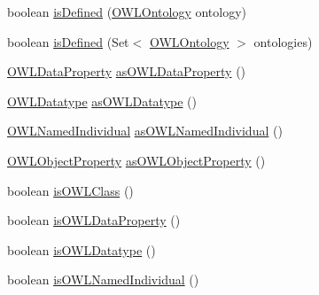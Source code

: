 \begin{DoxyCompactItemize}
\item 
boolean \hyperlink{classuk_1_1ac_1_1manchester_1_1cs_1_1owl_1_1owlapi_1_1_o_w_l_class_impl_a6ab339f48b3019760003eb203528b8b8}{is\-Defined} (\hyperlink{interfaceorg_1_1semanticweb_1_1owlapi_1_1model_1_1_o_w_l_ontology}{O\-W\-L\-Ontology} ontology)
\item 
boolean \hyperlink{classuk_1_1ac_1_1manchester_1_1cs_1_1owl_1_1owlapi_1_1_o_w_l_class_impl_a4c5fc0bef5dc8ad73453abae61482753}{is\-Defined} (Set$<$ \hyperlink{interfaceorg_1_1semanticweb_1_1owlapi_1_1model_1_1_o_w_l_ontology}{O\-W\-L\-Ontology} $>$ ontologies)
\item 
\hyperlink{interfaceorg_1_1semanticweb_1_1owlapi_1_1model_1_1_o_w_l_data_property}{O\-W\-L\-Data\-Property} \hyperlink{classuk_1_1ac_1_1manchester_1_1cs_1_1owl_1_1owlapi_1_1_o_w_l_class_impl_a73370d16b67a8cda8ff21317b3ca1a50}{as\-O\-W\-L\-Data\-Property} ()
\item 
\hyperlink{interfaceorg_1_1semanticweb_1_1owlapi_1_1model_1_1_o_w_l_datatype}{O\-W\-L\-Datatype} \hyperlink{classuk_1_1ac_1_1manchester_1_1cs_1_1owl_1_1owlapi_1_1_o_w_l_class_impl_a219756a726120819653da45e3bd7863e}{as\-O\-W\-L\-Datatype} ()
\item 
\hyperlink{interfaceorg_1_1semanticweb_1_1owlapi_1_1model_1_1_o_w_l_named_individual}{O\-W\-L\-Named\-Individual} \hyperlink{classuk_1_1ac_1_1manchester_1_1cs_1_1owl_1_1owlapi_1_1_o_w_l_class_impl_a0052c4a9bd94a27c0aba4c5d066ad377}{as\-O\-W\-L\-Named\-Individual} ()
\item 
\hyperlink{interfaceorg_1_1semanticweb_1_1owlapi_1_1model_1_1_o_w_l_object_property}{O\-W\-L\-Object\-Property} \hyperlink{classuk_1_1ac_1_1manchester_1_1cs_1_1owl_1_1owlapi_1_1_o_w_l_class_impl_a9b11675d25290ccded5a5191a532a727}{as\-O\-W\-L\-Object\-Property} ()
\item 
boolean \hyperlink{classuk_1_1ac_1_1manchester_1_1cs_1_1owl_1_1owlapi_1_1_o_w_l_class_impl_ac3160e9cc085b67400c0523c650f6d2d}{is\-O\-W\-L\-Class} ()
\item 
boolean \hyperlink{classuk_1_1ac_1_1manchester_1_1cs_1_1owl_1_1owlapi_1_1_o_w_l_class_impl_a70f04eaf381cf010e86d3e6a902cb65f}{is\-O\-W\-L\-Data\-Property} ()
\item 
boolean \hyperlink{classuk_1_1ac_1_1manchester_1_1cs_1_1owl_1_1owlapi_1_1_o_w_l_class_impl_a2ceb65dfec73f2947bbb9582459ae49b}{is\-O\-W\-L\-Datatype} ()
\item 
boolean \hyperlink{classuk_1_1ac_1_1manchester_1_1cs_1_1owl_1_1owlapi_1_1_o_w_l_class_impl_a29a45de6c22bf3b080b61915ca03a222}{is\-O\-W\-L\-Named\-Individual} ()

\end{DoxyCompactItemize}
